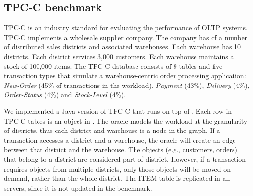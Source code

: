 
\subsection{TPC-C benchmark}
\label{sec:imp:tpcc}


TPC-C is an industry standard for evaluating the performance of OLTP systems.
TPC-C implements a wholesale supplier company.
The company has of a number of distributed sales districts and
associated warehouses. Each warehouse has 10 districts.
Each district services 3,000 customers. Each warehouse maintains a stock of 100,000 items.
The TPC-C database consists of 9 tables and five transaction types that simulate a warehouse-centric 
order processing application: \emph{New-Order} (45\% of transactions in the workload), \emph{Payment} (43\%), \emph{Delivery}
(4\%), \emph{Order-Status} (4\%) and \emph{Stock-Level} (4\%).

We implemented a Java version of TPC-C that runs on top of \dynastar. 
Each row in TPC-C tables is an object in \dynastar. The oracle models the workload at the granularity of districts,
thus each district and warehouse is a node in the graph. If a transaction accesses a district 
and a warehouse, the oracle will create an edge between that district and the warehouse.
The objects (e.g., customers, orders) that belong to a district 
are considered part of district. However, if a transaction requires
objects from multiple districts, only those objects will be moved on demand, rather than
the whole district.
The ITEM table is replicated in all servers, since it is not updated in the benchmark.

